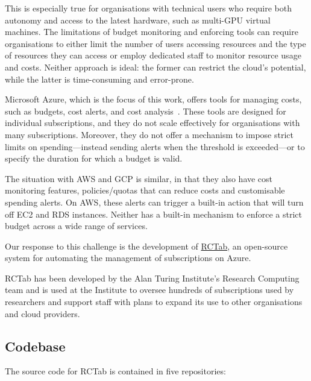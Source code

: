 \documentclass{article}
\begin{document}
This is especially true for organisations with technical users who
require both autonomy and access to the latest hardware, such as
multi-GPU virtual machines. The limitations of budget monitoring and
enforcing tools can require organisations to either limit the number of
users accessing resources and the type of resources they can access or
employ dedicated staff to monitor resource usage and costs. Neither
approach is ideal: the former can restrict the cloud's potential, while
the latter is time-consuming and error-prone.

Microsoft Azure, which is the focus of this work, offers tools for
managing costs, such as budgets, cost alerts, and cost analysis~\cite{azurecm}.
These tools are designed for individual subscriptions, and
they do not scale effectively for organisations with many subscriptions.
Moreover, they do not offer a mechanism to impose strict limits on
spending---instead sending alerts when the threshold is exceeded---or
to specify the duration for which a budget is valid.

The situation with AWS and GCP is similar, in that they also have cost monitoring features, policies/quotas that can reduce costs and customisable spending alerts.
On AWS, these alerts can trigger a built-in action that will turn off EC2 and RDS instances.
Neither has a built-in mechanism to enforce a strict budget across a wide range of services.

Our response to this challenge is the development of
\href{https://rctab.readthedocs.io/}{RCTab}, an open-source system for
automating the management of subscriptions on Azure.

RCTab has been developed by the Alan Turing Institute's Research
Computing team and is used at the Institute to oversee hundreds of
subscriptions used by researchers and support staff with plans to expand
its use to other organisations and cloud providers.

\subsection{Codebase}\label{codebase}

The source code for RCTab is contained in five repositories:
\end{document}
